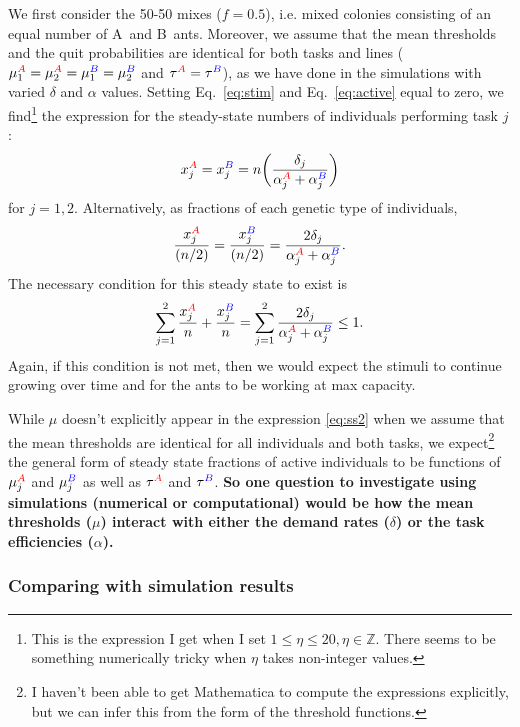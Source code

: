 \documentclass[10pt]{article}
\newcommand{\ZZ}{\mathbb{Z}}
\newcommand{\A}{{\color{red}A}}
\newcommand{\B}{{\color{blue}B}}
\begin{document}
{\color{orange}We first consider the 50-50 mixes ($f=0.5$), i.e. mixed colonies consisting of an equal number of \A\ and \B\ ants.}
Moreover, we assume that the mean thresholds and the quit probabilities are identical for both tasks and lines ($\mu_1^{\A} = \mu_2^{\A} = \mu_1^{\B} = \mu_2^{\B}$ and $\tau^{\A} = \tau^{\B}$), as we have done in the simulations with varied $\delta$ and $\alpha$ values. Setting Eq.~\eqref{eq:stim} and Eq.~\eqref{eq:active} equal to zero, we find\footnote{This is the expression I get when I set $1\leq \eta \leq 20, \eta \in \ZZ$. There seems to be something numerically tricky when $\eta$ takes non-integer values.} the expression for the steady-state numbers of individuals performing task $j$:%
\begin{equation}
     x_j^{\A} =  x_j^{\B} = n\bigg(\frac{\delta_j}{\alpha_j^{\A} + \alpha_j^{\B}}\bigg) \label{eq:ss2a}
\end{equation}
for $j = 1, 2$.
Alternatively, as fractions of each genetic type of individuals,
\begin{equation}
     \frac{x_j^{\A}}{(n/2)} =  \frac{x_j^{\B}}{(n/2)} = \frac{2\delta_j}{\alpha_j^{\A} + \alpha_j^{\B}}. \label{eq:ss2}
\end{equation}
The necessary condition for this steady state to exist is
\begin{equation}
     \sum_{j=1}^2 \frac{x_j^{\A}}{n} + \frac{x_j^{\B}}{n} 
     = \sum_{j=1}^2 \frac{2\delta_j}{\alpha_j^{\A} + \alpha_j^{\B}}
     \leq 1.
     \label{eq:cond2}
\end{equation}
Again, if this condition is not met, then we would expect the stimuli to continue growing over time and for the ants to be working at max capacity.

While $\mu$ doesn't explicitly appear in the expression \eqref{eq:ss2} when we assume that the mean thresholds are identical for all individuals and both tasks, we expect\footnote{I haven't been able to get Mathematica to compute the expressions explicitly, but we can infer this from the form of the threshold functions.} the general form of steady state fractions of active individuals to be functions of $\mu_j^{\A}$ and $\mu_j^{\B}$ as well as $\tau^{\A}$ and $\tau^{\B}$. \textbf{So one question to investigate using simulations (numerical or computational) would be \textbf{how the mean thresholds ($\mu$) interact with either the demand rates ($\delta$) or the task efficiencies ($\alpha$)}.}

\subsubsection{Comparing with simulation results}
\end{document}
